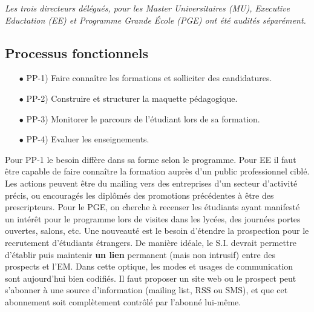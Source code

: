 \documentclass{book}
\begin{document}
\textit{Les  trois directeurs  délégués,  pour les  Master Universitaires  (MU),
  Executive Eductation  (EE) et Programme  Grande \'Ecole (PGE) ont  été audités
  séparément.}

\subsection{Processus fonctionnels}
\label{sc:pp-process}

\begin{itemize}
\item[$\bullet$] PP-1) Faire connaître les formations et solliciter des candidatures.
\item[$\bullet$] PP-2) Construire et structurer la maquette pédagogique.
\item[$\bullet$] PP-3) Monitorer le parcours de l'étudiant lors de sa formation.
\item[$\bullet$] PP-4) Evaluer les enseignements. 
\end{itemize}
\bigskip

Pour PP-1 le  besoin diffère dans sa  forme selon le programme. Pour  EE il faut
être capable  de faire connaître  la formation auprès d'un  public professionnel
ciblé. Les  actions peuvent être  du mailing  vers des entreprises  d'un secteur
d'activité précis, ou encouragés les  diplômés des promotions précédentes à être
des  prescripteurs. Pour  le  PGE, on  cherche à  recenser  les étudiants  ayant
manifesté un  intérêt pour  le programme  lors de visites  dans les  lycées, des
journées portes ouvertes, salons, etc. Une  nouveauté est le besoin d'étendre la
prospection pour  le recrutement d'étudiants  étrangers.  De manière  idéale, le
S.I. devrait permettre d'établir puis maintenir \textbf{un lien} permanent (mais
non intrusif)  entre des  prospects et  l'EM. Dans cette  optique, les  modes et
usages de communication sont aujourd'hui bien codifiés. Il faut proposer un site
web ou le prospect peut s'abonner  à une source d'information (mailing list, RSS
ou SMS), et que cet abonnement soit complètement contrôlé par l'abonné lui-même.
~\\
\end{document}
